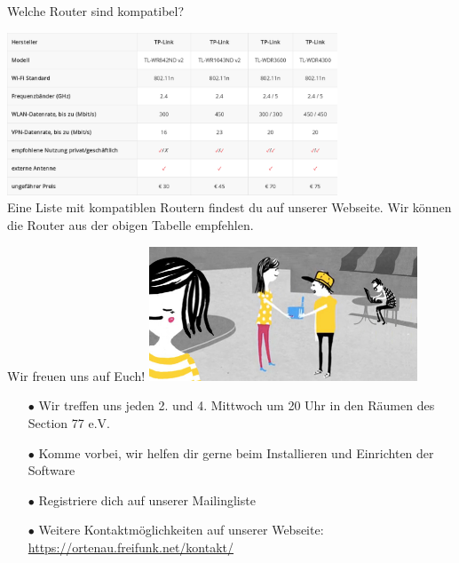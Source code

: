 \documentclass[10pt]{beamer}
\begin{document}
  \begin{frame}{Welche Router sind kompatibel?}
    \begin{center}
      \includegraphics[height=4.85cm]{images/router_recommendation_table}\\
      \vspace{1em}
      Eine Liste mit kompatiblen Routern findest du auf unserer Webseite. Wir können die Router aus der obigen Tabelle empfehlen.
      \vspace{1em}
    \end{center}
  \end{frame}


  \begin{frame}{Wir freuen uns auf Euch!}
    \hspace{1em}\includegraphics[width=0.6\textwidth]{images/router}
    \begin{itemize}
      \item[\textcolor{freifunkpink}{\Large$\bullet$}] Wir treffen uns jeden 2. und 4. Mittwoch um 20 Uhr in den Räumen des Section 77 e.V.
      \item[\textcolor{freifunkpink}{\Large$\bullet$}] Komme vorbei, wir helfen dir gerne beim Installieren und Einrichten der Software
      \item[\textcolor{freifunkpink}{\Large$\bullet$}] Registriere dich auf unserer Mailingliste
      \item[\textcolor{freifunkpink}{\Large$\bullet$}] Weitere Kontaktmöglichkeiten auf unserer Webseite:\\
      \url{https://ortenau.freifunk.net/kontakt/}
    \end{itemize}
  \end{frame}
\end{document}
